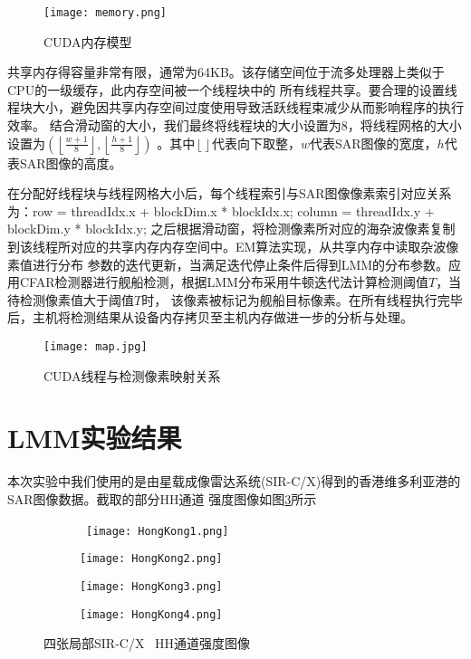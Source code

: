      \begin{figure}[H] %
      \centering
      \texttt{[image: memory.png]}
      \caption{CUDA内存模型}
      \label{fig:chap2:slide}
    \end{figure}   

    共享内存得容量非常有限，通常为64KB。该存储空间位于流多处理器上类似于CPU的一级缓存，此内存空间被一个线程块中的
    所有线程共享。要合理的设置线程块大小，避免因共享内存空间过度使用导致活跃线程束减少从而影响程序的执行效率。
    结合滑动窗的大小，我们最终将线程块的大小设置为8，将线程网格的大小设置为$(\left\lfloor {\frac{{w + 1}}{8}} \right\rfloor ,\left\lfloor {\frac{{h + 1}}{8}} \right\rfloor )$
    。其中$\left\lfloor {} \right\rfloor $代表向下取整，$w$代表SAR图像的宽度，$h$代表SAR图像的高度。
    
    在分配好线程块与线程网格大小后，每个线程索引与SAR图像像素索引对应关系为：row = threadIdx.x + blockDim.x * blockIdx.x; column = threadIdx.y + blockDim.y * blockIdx.y;
    之后根据滑动窗，将检测像素所对应的海杂波像素复制到该线程所对应的共享内存内存空间中。EM算法实现，从共享内存中读取杂波像素值进行分布
    参数的迭代更新，当满足迭代停止条件后得到LMM的分布参数。应用CFAR检测器进行舰船检测，根据LMM分布采用牛顿迭代法计算检测阈值$T$，当待检测像素值大于阈值$T$时，
    该像素被标记为舰船目标像素。在所有线程执行完毕后，主机将检测结果从设备内存拷贝至主机内存做进一步的分析与处理。

    \begin{figure}[H] %
      \centering
      \texttt{[image: map.jpg]}
      \caption{CUDA线程与检测像素映射关系}
      \label{fig:chap2:slide}
    \end{figure} 

\section{LMM实验结果}
    本次实验中我们使用的是由星载成像雷达系统(SIR-C/X)得到的香港维多利亚港的SAR图像数据。截取的部分HH通道
    强度图像如图\ref{fig:chap2:source}所示


  \begin{figure}[h]
    \centering%
    \begin{subfigure}{0.4\textwidth}\
      \texttt{[image: HongKong1.png]}
    \end{subfigure}%
    \begin{subfigure}{0.4\textwidth}
      \texttt{[image: HongKong2.png]}
    \end{subfigure}

    \begin{subfigure}{0.4\textwidth}
      \texttt{[image: HongKong3.png]}
    \end{subfigure}%
    \begin{subfigure}{0.4\textwidth}
      \texttt{[image: HongKong4.png]}
    \end{subfigure}   

    \caption{四张局部SIR-C/X \ HH通道强度图像}
    \label{fig:chap2:source}
  \end{figure}

